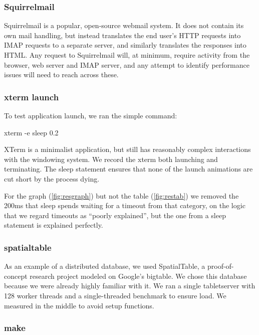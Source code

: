 \documentclass[10pt]{article}
\begin{document}
\subsubsection{Squirrelmail}

Squirrelmail\cite{Squirrelmail} is a popular, open-source webmail system.  It does not contain its own mail handling, but instead translates the end user's HTTP requests into IMAP requests to a separate server, and similarly translates the responses into HTML.  Any request to Squirrelmail will, at minimum, require activity from the browser, web server and IMAP server, and any attempt to identify performance issues will need to reach across these.

\subsubsection{xterm launch}

To test application launch, we ran the simple command:

\begin{tt} xterm -e sleep 0.2 \end{tt}

XTerm is a minimalist application, but still has reasonably complex interactions with the windowing system.  We record the xterm both launching and terminating.  The sleep statement ensures that none of the launch animations are cut short by the process dying.

For the graph (\ref{fig:resgraph}) but not the table (\ref{fig:restab}) we removed the 200ms that sleep spends waiting for a timeout from that category, on the logic that we regard timeouts as ``poorly explained'', but the one from a sleep statement is explained perfectly.

\subsubsection{spatialtable}

As an example of a distributed database, we used SpatialTable\cite{spatialtable}, a proof-of-concept research project modeled on Google's bigtable\cite{bigtable}.  We chose this database because we were already highly familiar with it.  We ran a single tabletserver with 128 worker threads and a single-threaded benchmark to ensure load.  We measured in the middle to avoid setup functions.

\subsubsection{make}
\end{document}
